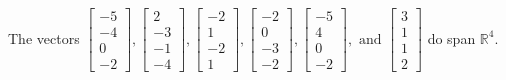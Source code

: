\begin{exercise}
\begin{exerciseStatement}
  \end{exerciseStatement}
  \begin{exerciseAnswer}
   The vectors \(\left[\begin{array}{r}
-5 \\
-4 \\
0 \\
-2
\end{array}\right] , \left[\begin{array}{r}
2 \\
-3 \\
-1 \\
-4
\end{array}\right] , \left[\begin{array}{r}
-2 \\
1 \\
-2 \\
1
\end{array}\right] , \left[\begin{array}{r}
-2 \\
0 \\
-3 \\
-2
\end{array}\right] , \left[\begin{array}{r}
-5 \\
4 \\
0 \\
-2
\end{array}\right] , \text{ and } \left[\begin{array}{r}
3 \\
1 \\
1 \\
2
\end{array}\right]\) 
  	 do  
	span \(\mathbb{R}^4\).
  


  \end{exerciseAnswer}
\end{exercise}